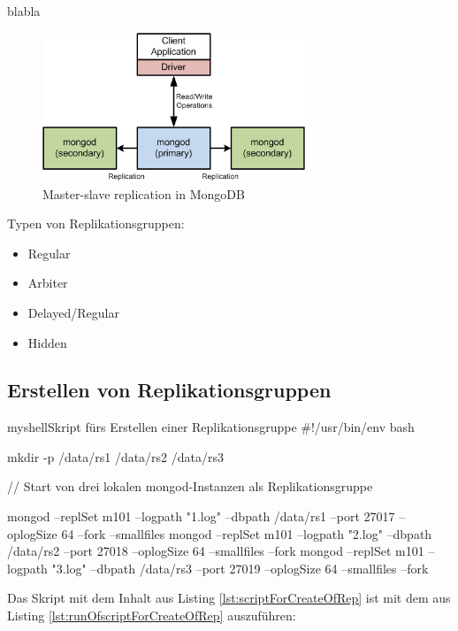 blabla
\begin{figure}
\centering
\includegraphics[width=0.7\textwidth]{resources/mongo_replication}
\caption[Master-slave replication in MongoDB]{Master-slave replication in MongoDB\protect\footnotemark}
\label{img:mongo_replication}
\end{figure}



Typen von Replikationsgruppen:
\begin{itemize}
\item Regular
\item Arbiter
\item Delayed/Regular
\item Hidden
\end{itemize}
\subsection{Erstellen von Replikationsgruppen}

\begin{listingsboxShell}[label={lst:scriptForCreateOfRep}]{myshell}{Skript fürs Erstellen einer Replikationsgruppe}
#!/usr/bin/env bash

mkdir -p /data/rs1 /data/rs2 /data/rs3

// Start von drei lokalen mongod-Instanzen als Replikationsgruppe

mongod --replSet m101 --logpath "1.log" --dbpath /data/rs1 --port 27017
--oplogSize 64 --fork --smallfiles
mongod --replSet m101 --logpath "2.log" --dbpath /data/rs2 --port 27018
--oplogSize 64 --smallfiles --fork
mongod --replSet m101 --logpath "3.log" --dbpath /data/rs3 --port 27019
--oplogSize 64 --smallfiles --fork
\end{listingsboxShell}

Das Skript mit dem Inhalt aus Listing \ref{lst:scriptForCreateOfRep} ist mit dem aus Listing \ref{lst:runOfscriptForCreateOfRep} auszuführen:

